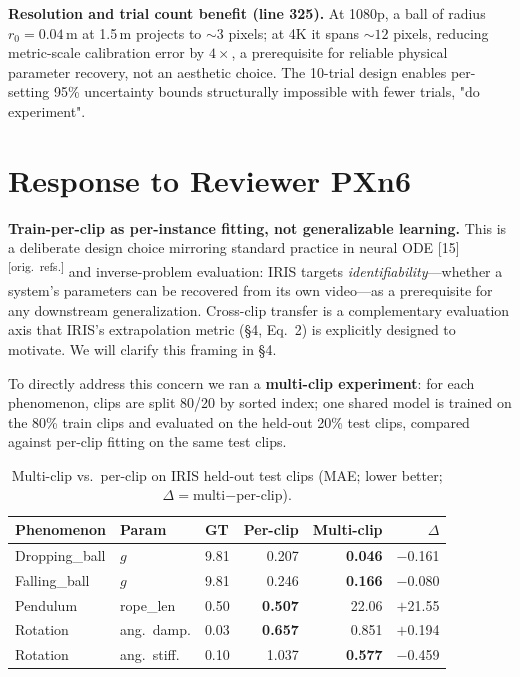 \documentclass[10pt,twocolumn,letterpaper]{article}
\newcommand{\origref}{\textsuperscript{\normalfont\scriptsize[orig.\ refs.]}}
\begin{document}
\noindent\textbf{Resolution and trial count benefit (line 325).}
At 1080p, a ball of radius $r_0{=}0.04$\,m at 1.5\,m projects to ${\sim}3$ pixels; at 4K it spans ${\sim}12$ pixels, reducing metric-scale calibration error by $4{\times}$, a prerequisite for reliable physical parameter recovery, not an aesthetic choice. The 10-trial design enables per-setting 95\% uncertainty bounds structurally impossible with fewer trials, "do experiment".

\section*{Response to Reviewer PXn6}

\noindent\textbf{Train-per-clip as per-instance fitting, not generalizable learning.}
This is a deliberate design choice mirroring standard practice in neural ODE [15]\origref{} and inverse-problem evaluation: IRIS targets \emph{identifiability}—whether a system's parameters can be recovered from its own video—as a prerequisite for any downstream generalization. Cross-clip transfer is a complementary evaluation axis that IRIS's extrapolation metric (\S4, Eq.~2) is explicitly designed to motivate. We will clarify this framing in \S4.

\noindent To directly address this concern we ran a \textbf{multi-clip experiment}: for each phenomenon, clips are split 80/20 by sorted index; one shared model is trained on the 80\% train clips and evaluated on the held-out 20\% test clips, compared against per-clip fitting on the same test clips.

\begin{table}[h]
\centering
\caption{Multi-clip vs.\ per-clip on IRIS held-out test clips (MAE; lower better; $\Delta{=}$multi$-$per-clip).}
\label{tab:multi_clip}
\small\setlength{\tabcolsep}{3pt}
\begin{tabular}{@{}lllrrr@{}}
\toprule
Phenomenon & Param & GT & Per-clip & Multi-clip & $\Delta$ \\
\midrule
Dropping\_ball & $g$ & 9.81 & 0.207 & \textbf{0.046} & $-$0.161 \\
Falling\_ball  & $g$ & 9.81 & 0.246 & \textbf{0.166} & $-$0.080 \\
Pendulum       & rope\_len & 0.50 & \textbf{0.507} & 22.06 & $+$21.55 \\
Rotation       & ang.\ damp. & 0.03 & \textbf{0.657} & 0.851 & $+$0.194 \\
Rotation       & ang.\ stiff. & 0.10 & 1.037 & \textbf{0.577} & $-$0.459 \\
\bottomrule
\end{tabular}
\end{table}
\end{document}
